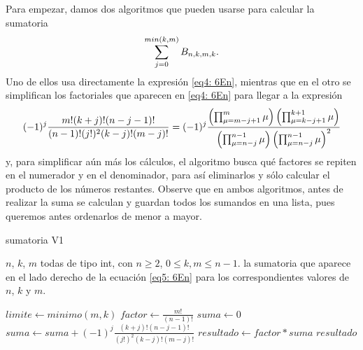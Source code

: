 Para empezar, damos dos algoritmos que pueden
usarse para calcular la sumatoria 
\[
\sum\limits_{j=0}^{min(k,m)}B_{n,k,m,k}.
\] 
Uno de ellos usa
directamente la expresión \eqref{eq4: 6En}, mientras
que en el otro se simplifican los factoriales que
aparecen en \eqref{eq4: 6En} para llegar a la expresión
\[
(-1)^{j} \frac{m! (k+j)!(n-j-1)!}{(n-1)!(j!)^{2}(k-j)!(m-j)!}
= (-1)^{j}
\frac{\left( \prod_{\mu=m-j+1}^{m}{\mu} \right)
\left( \prod_{\mu=k-j+1}^{k+1}{\mu} \right)
}{
\left( \prod_{\mu=n-j}^{n-1}{\mu} \right)
\left( \prod_{\mu=n-j}^{n-1}{\mu} \right)^{2}
}
\]
y, para simplificar aún más los cálculos, el algoritmo
busca qué factores se repiten en el numerador y en el denominador,
para así eliminarlos y sólo calcular el producto de los 
números restantes. Observe que en ambos algoritmos, antes
de realizar la suma se calculan y guardan todos los sumandos
en una lista, pues queremos antes ordenarlos de menor a mayor.

\begin{algorithm}
\caption{sumatoria V1}
\begin{algorithmic}[1] 
\REQUIRE $n$, $k$, $m$ todas de tipo int, con $n \geq 2$, 
$0 \leq k, m \leq n-1$.
\ENSURE la sumatoria que aparece en el lado derecho de la
ecuación \eqref{eq5: 6En}
para los correspondientes valores de $n$, $k$ y $m$.

\STATE $limite \leftarrow minimo(m,k)$
\STATE $factor \leftarrow \frac{m!}{(n-1)!}$
\STATE $suma \leftarrow 0$
\STATE $suma \leftarrow suma + 
(-1)^{j} \frac{(k+j)!(n-j-1)!}{(j!)^{2}(k-j)!(m-j)!}$
\ENDFOR
\STATE $resultado \leftarrow factor*suma$
\RETURN $resultado$
\end{algorithmic}
\end{algorithm}


